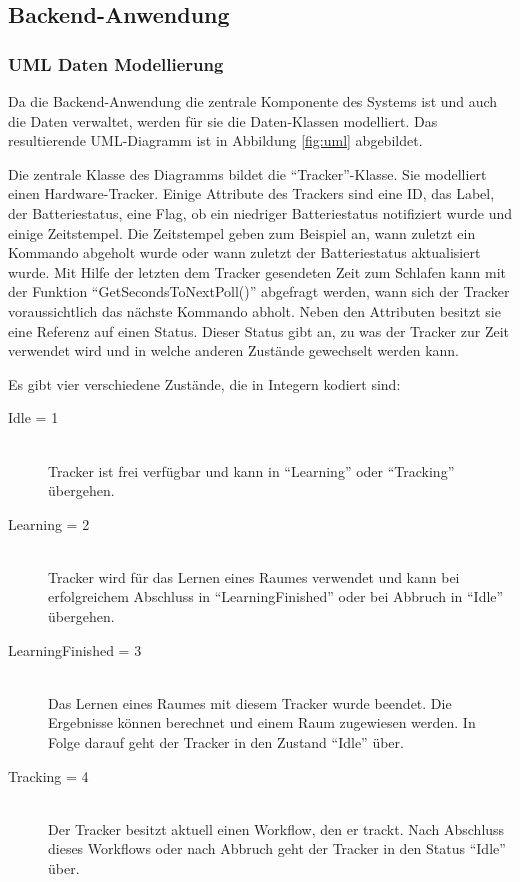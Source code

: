 \FloatBarrier
\subsection{Backend-Anwendung} \label{sec:backend}

\subsubsection{UML Daten Modellierung}
Da die Backend-Anwendung die zentrale Komponente des Systems ist und auch die Daten verwaltet, werden für sie die Daten-Klassen modelliert.
Das resultierende UML-Diagramm ist in Abbildung \ref{fig:uml} abgebildet.

Die zentrale Klasse des Diagramms bildet die \enquote{Tracker}-Klasse.
Sie modelliert einen Hardware-Tracker.
Einige Attribute des Trackers sind eine ID, das Label, der Batteriestatus, eine Flag, ob ein niedriger Batteriestatus notifiziert wurde
und einige Zeitstempel.
Die Zeitstempel geben zum Beispiel an, wann zuletzt ein Kommando abgeholt wurde oder wann zuletzt der Batteriestatus aktualisiert wurde.
Mit Hilfe der letzten dem Tracker gesendeten Zeit zum Schlafen kann mit der Funktion \enquote{GetSecondsToNextPoll()} abgefragt werden,
wann sich der Tracker voraussichtlich das nächste Kommando abholt.
Neben den Attributen besitzt sie eine Referenz auf einen Status.
Dieser Status gibt an, zu was der Tracker zur Zeit verwendet wird und in welche anderen Zustände gewechselt werden kann.

Es gibt vier verschiedene Zustände, die in Integern kodiert sind:
\begin{description}
	\item[Idle = 1] \hfill \\
		Tracker ist frei verfügbar und kann in \enquote{Learning} oder \enquote{Tracking} übergehen.
	\item[Learning = 2] \hfill \\
		Tracker wird für das Lernen eines Raumes verwendet und kann bei erfolgreichem Abschluss in \enquote{LearningFinished} oder bei Abbruch in \enquote{Idle} übergehen.
	\item[LearningFinished = 3] \hfill \\
		Das Lernen eines Raumes mit diesem Tracker wurde beendet. Die Ergebnisse können berechnet und einem Raum zugewiesen werden. In Folge darauf geht der Tracker in den Zustand \enquote{Idle} über.
	\item[Tracking = 4] \hfill \\
		Der Tracker besitzt aktuell einen Workflow, den er trackt. Nach Abschluss dieses Workflows oder nach Abbruch geht der Tracker in den Status \enquote{Idle} über.
\end{description}


